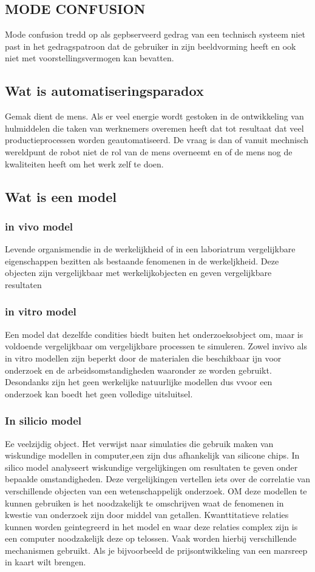 \subsection{MODE CONFUSION }
Mode confusion tredd op als gepbserveerd gedrag van een technisch systeem niet past in het gedragspatroon dat de gebruiker in zijn beeldvorming heeft  en ook niet met voorstellingsvermogen kan bevatten.
\subsection{Wat is automatiseringsparadox}
Gemak dient de mens. Als er veel energie wordt gestoken in de ontwikkeling van hulmiddelen die taken van werknemers overemen heeft dat tot resultaat dat veel productieprocessen worden geautomatiseerd. De vraag is dan of vanuit mechnisch wereldpunt de robot niet de rol van de mens overneemt en of de mens nog de kwaliteiten heeft om het werk zelf te doen.
\cite{bicker21102016automatiseringsparadox }
\cite{vseautoparadox }
\cite{blogxot21112016slimapparaat }
 

\subsection{Wat is een model}
 
\subsubsection{in vivo model}
Levende organismendie in de werkelijkheid of in een laboriatrum vergelijkbare eigenschappen bezitten als bestaande fenomenen in de werkeljkheid. Deze objecten zijn vergelijkbaar met werkelijkobjecten en geven vergelijkbare resultaten
\subsubsection{in vitro model}
Een model dat dezelfde condities biedt  buiten het onderzoeksobject om, maar is voldoende vergelijkbaar om vergelijkbare processen te simuleren.
Zowel invivo als in vitro modellen zijn beperkt door de materialen die beschikbaar ijn voor onderzoek en de arbeidsomstandigheden waaronder ze worden gebruikt. Desondanks zijn het geen werkelijke natuurlijke modellen dus vvoor een onderzoek kan boedt het geen volledige uitsluitsel.
\subsubsection{In silicio model}
Ee veelzijdig object. Het verwijst naar simulaties die gebruik maken van wiskundige modellen in computer,een zijn dus afhankelijk van silicone chips. In silico model analyseert  wiskundige vergelijkingen om resultaten te geven onder bepaalde omstandigheden. Deze vergelijkingen vertellen iets over de correlatie van verschillende objecten van een wetenschappelijk onderzoek. OM deze modellen te kunnen gebruiken is het noodzakelijk te omschrijven waat de fenomenen in kwestie van onderzoek zijn door middel van getallen. Kwanttitatieve relaties kunnen worden geintegreerd in het model en waar deze relaties complex zijn is een computer noodzakelijk deze op telossen. Vaak worden hierbij verschillende mechanismen gebruikt. Als je bijvoorbeeld de prijsontwikkeling van een marsreep in kaart wilt brengen.
